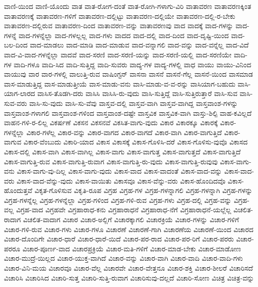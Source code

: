 {ವಾಣಿ-ಯಿಂದ
ವಾಣಿ-ಯೊಂದು
ವಾತ
ವಾತ-ರೋಗ-ದಂತೆ
ವಾತ-ರೋಗಿ-ಗಳಾಗು-ವಿರಿ
ವಾತಾವರಣ
ವಾತಾವರಣಕ್ಕಿಂತ
ವಾತಾವರಣಕ್ಕೆ
ವಾತಾವರಣ-ಗಳಿಗೆ
ವಾತಾವರಣ-ದಲ್ಲಿಟ್ಟು
ವಾತಾವರಣ-ದಲ್ಲಿಯೇ
ವಾತಾವರಣ-ದಲ್ಲಿ-ರ-ಬೇಕು
ವಾತಾವರಣ-ದಲ್ಲಿರುವ
ವಾತಾವರಣ-ದಿಂದ
ವಾತಾವರಣ-ವನ್ನು
ವಾತಾವರಣವು
ವಾದ
ವಾದಕ್ಕೆ
ವಾದ-ಗಳನ್ನು
ವಾದ-ಗಳನ್ನೆ
ವಾದ-ಗಳನ್ನೆಲ್ಲಾ
ವಾದ-ಗಳಲ್ಲಲ್ಲ
ವಾದ-ಗಳು
ವಾದದ
ವಾದ-ದಲ್ಲಿ
ವಾದ-ದಿಂದ
ವಾದ-ದೃಷ್ಟಿ-ಯಿಂದ
ವಾದ-ಬಲ-ದಿಂದ
ವಾದ-ಮಾಡಲು
ವಾದ-ಮಾಡಿ
ವಾದ-ಮಾಡುವ
ವಾದ-ವನ್ನಾಗಲಿ
ವಾದ-ವನ್ನು
ವಾದ-ವನ್ನೆಲ್ಲ
ವಾದ-ವಿದೆ
ವಾದ-ವಿ-ವಾದ-ಗಳನ್ನೆಲ್ಲಾ
ವಾದವೆ
ವಾದ-ಸರಣಿ
ವಾದ-ಸರಣಿ-ಯನ್ನು
ವಾದ-ಸರಣಿ-ಯಲ್ಲಿ
ವಾದ-ಸರಣಿಯೇ
ವಾದಿ-ಗಳ
ವಾದಿ-ಗಳೂ
ವಾದಿ-ಸಿದ
ವಾದಿ-ಸುತ್ತಿದ್ದ
ವಾದಿ-ಸುವರು
ವಾದ್ಯ-ಗಳ
ವಾದ್ಯ-ಗಳಲ್ಲಿ
ವಾಧ
ವಾಯು
ವಾಯು-ವಿನಿಂದ
ವಾಯುವು
ವಾರ
ವಾರ-ಗಳಲ್ಲಿ
ವಾಲುತ್ತಿ-ರುವ
ವಾಷಿಂಗ್ಟನ್
ವಾಸನಾ
ವಾಸನೆ
ವಾಸನೆ-ಗೆಲ್ಲ
ವಾಸನೆ-ಯಿಂದ
ವಾಸಮಾಡ
ವಾಸ-ಮಾಡುತ್ತಿದ್ದ
ವಾಸ-ಮಾಡುತ್ತೀಯೆ
ವಾಸ-ಮಾಡು-ವನು
ವಾಸಿ-ಮಾಡು-ವ-ವ-ರನ್ನು
ವಾಸಿಯಾಗ-ಬಹುದು
ವಾಸಿ-ಯಾಗ-ಲಾರದ
ವಾಸಿಸ-ತೊಡಗಿ-ದರು
ವಾಸಿಸಿ
ವಾಸಿಸಿ-ರು-ವುದು
ವಾಸಿ-ಸುತ್ತಿದ್ದೆ
ವಾಸಿ-ಸುತ್ತಿರುತ್ತಾರೆ
ವಾಸಿ-ಸುವ
ವಾಸಿ-ಸುವ-ವರು
ವಾಸಿ-ಸು-ವುದು
ವಾಸಿ-ಸು-ವೆವು
ವಾಸ್ತವ-ದಲ್ಲಿ
ವಾಸ್ತವ-ವಾಗಿ
ವಾಸ್ತವ-ವಾಗಿದ್ದ
ವಾಸ್ತವಾಂಶ-ಗಳನ್ನು
ವಾಸ್ತವಾಂಶ-ಗಳಾಗಲಿ
ವಾಸ್ತವಾಂಶ-ಗಳಿಂದ
ವಾಸ್ತವಾಂಶ-ದಷ್ಟೇ
ವಾಸ್ತವಿಕ
ವಾಸ್ತವಿಕ-ವಾಗಿ
ವಾಸ್ತು-ಶಿಲ್ಪಿ
ವಾಹ-ಕವಿಲ್ಲದೆ
ವಾಹನ-ಗಳಿ-ರ-ಲಿಲ್ಲ
ವಿಕರ್ಷಣೆ
ವಿಕಸನ
ವಿಕಸನವೆ
ವಿಕಸಿತ-ವಾಗು-ವುದು
ವಿಕಾರ
ವಿಕಾರಕ್ಕೂ
ವಿಕಾರಕ್ಕೆ
ವಿಕಾರ-ಗಳನ್ನೆಲ್ಲಾ
ವಿಕಾರ-ಗಳೆಲ್ಲ
ವಿಕಾರ-ವನ್ನು
ವಿಕಾರ-ವಾಗದ
ವಿಕಾರ-ವಾಗದೆ
ವಿಕಾರ-ವಾಗಿ
ವಿಕಾರ-ವಾಗುತ್ತಿದೆ
ವಿಕಾರ-ವಾಗುವ
ವಿಕಾರ-ವೆಂಬುದು
ವಿಕಾರಿ-ಯಾದ
ವಿಕಾಸ
ವಿಕಾಸಕ್ಕೆ
ವಿಕಾಸ-ಗೊಳಿಸಿ-ದರೆ
ವಿಕಾಸ-ಗೊಳಿಸು-ವುವೊ
ವಿಕಾಸದ
ವಿಕಾಸ-ದಲ್ಲಿ
ವಿಕಾಸ-ವಾಗಿ
ವಿಕಾಸ-ವಾಗಿಲ್ಲ
ವಿಕಾಸ-ವಾಗು
ವಿಕಾಸ-ವಾಗುತ್ತ
ವಿಕಾಸ-ವಾಗುತ್ತದೆ
ವಿಕಾಸ-ವಾಗುತ್ತಿದೆ
ವಿಕಾಸ-ವಾಗುತ್ತಿ-ರುವ
ವಿಕಾಸ-ವಾಗುತ್ತಿ-ರುವಾಗ
ವಿಕಾಸ-ವಾಗುತ್ತಿ-ರು-ವುದು
ವಿಕಾಸ-ವಾಗುತ್ತಿ-ರುವುವು
ವಿಕಾಸ-ವಾಗು-ವನು
ವಿಕಾಸ-ವಾಗು-ವು-ದಿಲ್ಲ
ವಿಕಾಸ-ವಾಗು-ವುದು
ವಿಕಾಸ-ವಾದ
ವಿಕಾಸ-ವಾದಂತೆ
ವಿಕಾಸ-ವಾದ-ವನ್ನು
ವಿಕಾಸ-ವಾದ-ವರು
ವಿಕಾಸ-ವಾದ-ವೆನ್ನು-ವುದು
ವಿಕಾಸ-ವಾಯಿತು
ವಿಕಾಸವೂ
ವಿಕಾಸ-ವೆನ್ನು-ವರು
ವಿಕಾಸ-ಹೊಂದಿದವೊ
ವಿಕಾಸ-ಹೊಂದುತ್ತವೆ
ವಿಕೃತ-ಗೊಳಿಸುವ
ವಿಕೃತಿ-ರೂಪ
ವಿಗ್ರಹ
ವಿಗ್ರಹ-ಗಳ
ವಿಗ್ರಹ-ಗಳನ್ನಾಗಲಿ
ವಿಗ್ರಹ-ಗಳನ್ನಾಗಿ
ವಿಗ್ರಹ-ಗಳನ್ನು
ವಿಗ್ರಹ-ಗಳನ್ನೆಲ್ಲ
ವಿಗ್ರಹ-ಗಳನ್ನೆಲ್ಲಾ
ವಿಗ್ರಹ-ಗಳಿಂದ
ವಿಗ್ರಹ-ಗಳಿ-ರುವ
ವಿಗ್ರಹ-ಗಳು
ವಿಗ್ರಹ-ದಲ್ಲಿ
ವಿಗ್ರಹ-ವನ್ನು
ವಿಗ್ರಹ-ವಲ್ಲ
ವಿಗ್ರಹ-ವಾದ
ವಿಗ್ರಹವೇ
ವಿಗ್ರಹಾರಾಧ-ಕನು
ವಿಗ್ರಹಾರಾಧನೆ
ವಿಗ್ರಹಾರಾಧ-ನೆಗೆ
ವಿಗ್ರಹಾರಾಧನೆ-ಯಲ್ಲೆಲ್ಲ
ವಿಚಲಿತ-ರಾದಾಗ
ವಿಚಲಿತ-ವಾದಾಗ
ವಿಚಾರ
ವಿಚಾರ-ಅಲ್ಲಿಗೆ
ವಿಚಾರಕ್ಕಾಗಲಿ
ವಿಚಾರಕ್ರಿಯೆ
ವಿಚಾರ-ಗಳನ್ನು
ವಿಚಾರ-ಗಳಿಗೆ
ವಿಚಾರ-ಗಳಿ-ರುವ
ವಿಚಾರ-ಗಳು
ವಿಚಾರ-ಗಳೂ
ವಿಚಾರಣೆ
ವಿಚಾರಣೆ-ಗಾಗಿ
ವಿಚಾರಣೆಯ
ವಿಚಾರಣೆ-ಯಿಂದ
ವಿಚಾರದ
ವಿಚಾರ-ದೊಂದಿಗೇ
ವಿಚಾರ-ಧಾರೆ
ವಿಚಾರ-ಧಾರೆ-ಯಿದೆ
ವಿಚಾರ-ಪರ-ರಾದ
ವಿಚಾರ-ಪರ-ರಿಗೆ
ವಿಚಾರ-ಪರರು
ವಿಚಾರ-ಪರರೂ
ವಿಚಾರ-ಪೂರ್ಣ-ವಾದ
ವಿಚಾರಪ್ರಕ್ರಿಯೆ
ವಿಚಾರ-ಮತಿ-ಗಳಿಗೆ
ವಿಚಾರ-ಮಾಡ-ಬೇಕು
ವಿಚಾರ-ಮಾಡೋಣ
ವಿಚಾರ-ಮುದ್ರೆ-ಯಿಲ್ಲದ
ವಿಚಾರ-ಯುಕ್ತ-ವಾಗಿದೆ
ವಿಚಾರ-ವನ್ನು
ವಿಚಾರ-ವಾಗಿ
ವಿಚಾರ-ವಾದಿ
ವಿಚಾರ-ವಾದಿ-ಗಳು
ವಿಚಾರ-ವಿನಿ-ಮಯ
ವಿಚಾರವೂ
ವಿಚಾರ-ವೆಲ್ಲ
ವಿಚಾರವೇ
ವಿಚಾರ-ವೇತ್ತನೂ
ವಿಚಾರ-ಶಕ್ತಿ
ವಿಚಾರ-ಶೀಲರೆ
ವಿಚಾರಿಸದೆ
ವಿಚಾರಿಸಿ
ವಿಚಾರಿಸಿದ
ವಿಚಾರಿ-ಸುತ್ತ
ವಿಚಾರಿ-ಸುತ್ತಿ-ರುವಾಗ
ವಿಚಾರಿಸುವು-ದಲ್ಲದೆ
ವಿಚಾರಿ-ಸೋಣ
ವಿಚಿತ್ರ
ವಿಚಿತ್ರ-ವನ್ನು
}
